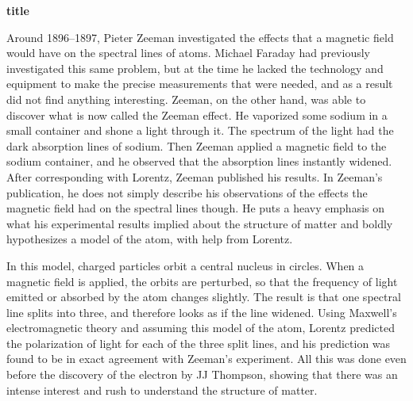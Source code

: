 \documentclass[12pt, oneside, letterpaper, fleqn]{article}
\begin{document}
\begin{center}
\textbf{title}
\end{center}

Around 1896--1897, Pieter Zeeman investigated the effects that a
magnetic field would have on the spectral lines of atoms. Michael
Faraday had previously investigated this same problem, but at the time
he lacked the technology and equipment to make the precise measurements
that were needed, and as a result did not find anything interesting.
Zeeman, on the other hand, was able to discover what is now called the Zeeman
effect. He vaporized some sodium in a small container and shone a light
through it. The spectrum of the light had the dark absorption lines of
sodium. Then Zeeman applied a magnetic field to the sodium container,
and he observed that the absorption lines instantly widened. After
corresponding with Lorentz, Zeeman published his results.
In Zeeman's publication, he does not simply describe his
observations of the effects the magnetic field had on the spectral lines
though. He puts a heavy emphasis on what his
experimental results implied about the structure of matter and boldly hypothesizes
a model of the atom, with help from Lorentz.

In this model, charged particles orbit a central nucleus in circles.
When a magnetic field is applied, the orbits are perturbed, so that the
frequency of light emitted or absorbed by the atom changes slightly. The
result is that one spectral line splits into three, and therefore looks
as if the line widened. Using Maxwell's electromagnetic theory and
assuming this model of the atom, Lorentz
predicted the polarization of light for each of the three split lines,
and his prediction was found to be in exact agreement with Zeeman's
experiment. All this was done even before the discovery of the electron by JJ
Thompson, showing that there was an intense interest and rush to
understand the structure of matter.

\nocite{*}


\end{document}

